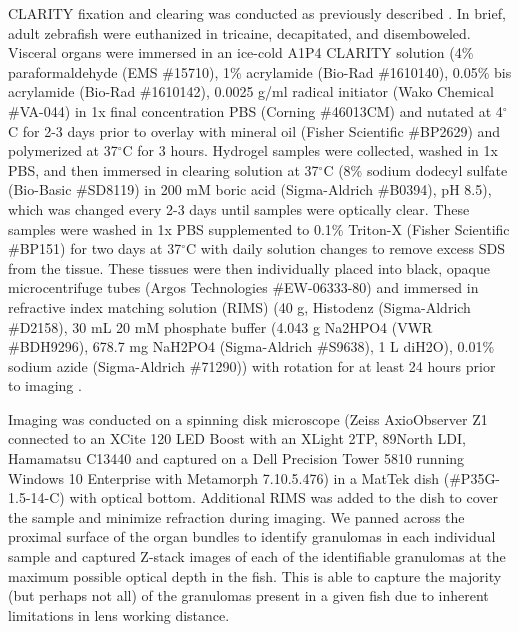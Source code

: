 CLARITY fixation and clearing was conducted as previously described \citep{Cronan2015}. In brief, adult zebrafish were euthanized in tricaine, decapitated, and disemboweled. Visceral organs were immersed in an ice-cold A1P4 CLARITY solution (4\% paraformaldehyde (EMS \#15710), 1\% acrylamide (Bio-Rad \#1610140), 0.05\% bis acrylamide (Bio-Rad \#1610142), 0.0025 g/ml radical initiator (Wako Chemical \#VA-044) in 1x final concentration PBS (Corning \#46013CM) and nutated at 4$^{\circ}$C for 2-3 days prior to overlay with mineral oil (Fisher Scientific \#BP2629) and polymerized at 37$^{\circ}$C for 3 hours. Hydrogel samples were collected, washed in 1x PBS, and then immersed in clearing solution at 37$^{\circ}$C (8\% sodium dodecyl sulfate (Bio-Basic \#SD8119) in 200 mM boric acid (Sigma-Aldrich \#B0394), pH 8.5), which was changed every 2-3 days until samples were optically clear. These samples were washed in 1x PBS supplemented to 0.1\% Triton-X (Fisher Scientific \#BP151) for two days at 37$^{\circ}$C with daily solution changes to remove excess SDS from the tissue. These tissues were then individually placed into black, opaque microcentrifuge tubes (Argos Technologies \#EW-06333-80) and immersed in refractive index matching solution (RIMS) (40 g, Histodenz (Sigma-Aldrich \#D2158), 30 mL 20 mM phosphate buffer (4.043 g Na2HPO4 (VWR \#BDH9296), 678.7 mg NaH2PO4 (Sigma-Aldrich \#S9638), 1 L diH2O), 0.01\% sodium azide (Sigma-Aldrich \#71290)) with rotation for at least 24 hours prior to imaging \citep{Yang2014d}. 

Imaging was conducted on a spinning disk microscope (Zeiss AxioObserver Z1 connected to an XCite 120 LED Boost with an XLight 2TP, 89North LDI, Hamamatsu C13440 and captured on a Dell Precision Tower 5810 running Windows 10 Enterprise with Metamorph 7.10.5.476) in a MatTek dish (\#P35G-1.5-14-C) with optical bottom. Additional RIMS was added to the dish to cover the sample and minimize refraction during imaging. We panned across the proximal surface of the organ bundles to identify granulomas in each individual sample and captured Z-stack images of each of the identifiable granulomas at the maximum possible optical depth in the fish. This is able to capture the majority (but perhaps not all) of the granulomas present in a given fish due to inherent limitations in lens working distance.

